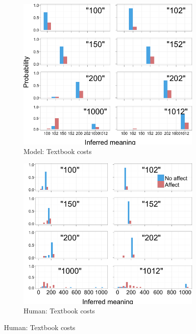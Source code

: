 \documentclass{article} %
\begin{document}
\begin{figure}[H]
        \begin{subfigure}[b]{0.51\textwidth}
                \centering
                \caption{Model: Textbook costs}
                \includegraphics[width=\textwidth]{model_textbook_all.png}
	\end{subfigure}
        \begin{subfigure}[b]{0.51\textwidth}
                \centering
                \caption{Human: Textbook costs}
                \includegraphics[width=\textwidth]{humans_textbook_all.png}
	\end{subfigure}
	\qquad
	

\end{figure}
\end{document}
